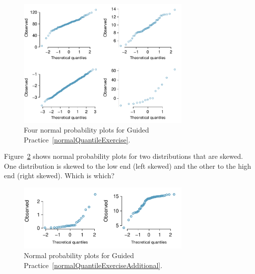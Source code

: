 \begin{figure}[h]
\centering
\includegraphics[width=0.75\textwidth]{ch_distributions/figures/normalQuantileExer/normalQuantileExer}
\caption{Four normal probability plots for Guided Practice~\ref{normalQuantileExercise}.}
\label{normalQuantileExer}
\end{figure}

\begin{exercisewrap}
\begin{nexercise} \label{normalQuantileExerciseAdditional}
Figure~\ref{normalQuantileExerAdditional} shows normal probability plots for two distributions that are skewed. One distribution is skewed to the low end (left skewed) and the other to the high end (right skewed). Which is which?\footnotemark
\end{nexercise}
\end{exercisewrap}

\begin{figure}[h]
\centering
\includegraphics[width=0.75\textwidth]{ch_distributions/figures/normalQuantileExer/normalQuantileExerAdditional}
\caption{Normal probability plots for Guided Practice~\ref{normalQuantileExerciseAdditional}.}
\label{normalQuantileExerAdditional}
\end{figure}



